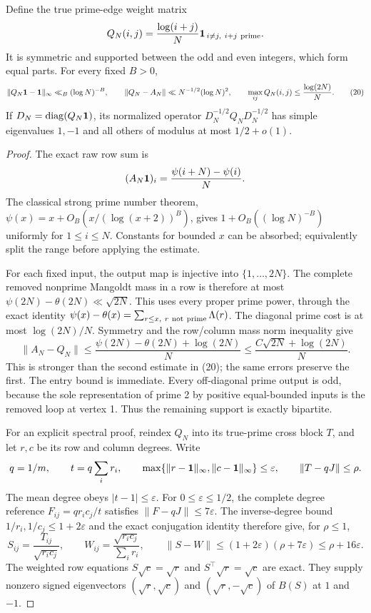 \begin{lemma}
\label{lem:primeweights}
Define the true prime-edge weight matrix
\[
 Q_N(i,j)=\frac{\log(i+j)}{N}
       \mathbf1_{\,i\ne j,\ i+j\ {\rm prime}}.
\]
It is symmetric and supported between the odd and even
integers, which form equal parts.
For every fixed \(B>0\),
\[
 \|Q_N\mathbf1-\mathbf1\|_\infty\ll_B(\log N)^{-B},\qquad
 \|Q_N-A_N\|\ll N^{-1/2}(\log N)^2,\qquad
 \max_{ij}Q_N(i,j)\leq\frac{\log(2N)}N.                      \tag{20}
\]
If \(D_N=\operatorname{diag}(Q_N\mathbf1)\), its normalized operator
\(D_N^{-1/2}Q_ND_N^{-1/2}\) has simple eigenvalues \(1,-1\)
and all others of modulus at most \(1/2+o(1)\).
\end{lemma}
\begin{proof}
The exact raw row sum is
\[
 (A_N\mathbf1)_i
       =\frac{\psi(i+N)-\psi(i)}{N}.
\]
The classical strong prime number theorem,
\(\psi(x)=x+O_B(x/(\log(x+2))^B)\), gives \(1+
O_B((\log N)^{-B})\) uniformly for \(1\leq i\leq N\).
Constants for bounded \(x\) can be absorbed; equivalently
split the range before applying the estimate.

For each fixed input, the output map is injective into
\(\{1,\ldots,2N\}\). The complete removed nonprime Mangoldt mass
in a row is therefore at most
\(\psi(2N)-\theta(2N)\ll\sqrt{2N}\).
This uses every proper prime power, through the exact identity
\(\psi(x)-\theta(x)=\sum_{r\leq x,\ r\ {\rm not\ prime}}\Lambda(r)\).
The diagonal prime cost is at most \(\log(2N)/N\).
Symmetry and the row/column mass norm inequality give
\[
 \|A_N-Q_N\|\leq
 \frac{\psi(2N)-\theta(2N)+\log(2N)}N
 \leq\frac{C\sqrt{2N}+\log(2N)}N.
\]
This is stronger than the second estimate in (20);
the same errors preserve the first.
The entry bound is immediate.
Every off-diagonal prime output is odd, because the sole
representation of prime 2 by positive equal-bounded inputs
is the removed loop at vertex 1.
Thus the remaining support is exactly bipartite.

For an explicit spectral proof, reindex \(Q_N\) into its true-prime
cross block \(T\), and let \(r,c\) be its row and column degrees.
Write
\[
 q=1/m,\qquad t=q\sum_i r_i,\qquad
 \max\{\|r-\mathbf1\|_\infty,\|c-\mathbf1\|_\infty\}\leq\varepsilon,
 \qquad \|T-qJ\|\leq\rho.
\]
The mean degree obeys \(|t-1|\leq\varepsilon\).
For \(0\leq\varepsilon\leq1/2\), the complete degree reference
\(F_{ij}=qr_ic_j/t\) satisfies \(\|F-qJ\|\leq7\varepsilon\).
The inverse-degree bound \(1/r_i,1/c_j\leq1+2\varepsilon\)
and the exact conjugation identity therefore give, for \(\rho\leq1\),
\[
 S_{ij}=\frac{T_{ij}}{\sqrt{r_i c_j}},\qquad
 W_{ij}=\frac{\sqrt{r_i c_j}}{\sum_i r_i},\qquad
 \|S-W\|\leq(1+2\varepsilon)(\rho+7\varepsilon)
                       \leq\rho+16\varepsilon .
\]
The weighted row equations \(S\sqrt c=\sqrt r\) and
\(S^\top\sqrt r=\sqrt c\) are exact.
They supply nonzero signed eigenvectors
\((\sqrt r,\sqrt c)\) and \((\sqrt r,-\sqrt c)\) of \(B(S)\)
at \(1\) and \(-1\).


\end{proof}
